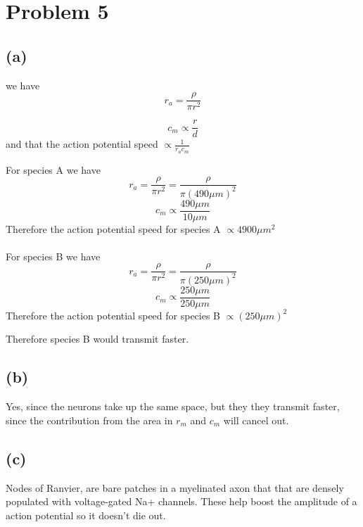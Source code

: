 \documentclass[12pt]{article}
\begin{document}
\section*{Problem 5}
\subsection*{(a)}
we have
$$r_a=\frac{\rho}{\pi r^2}$$

$$c_m\propto\frac{r}{d}$$
and that the action potential speed $\propto\frac{1}{r_ac_m}$


For species A we have
$$r_a=\frac{\rho}{\pi r^2}=\frac{\rho}{\pi (490\mu m)^2}$$
$$c_m\propto\frac{490\mu m}{10\mu m}$$Therefore the action potential speed for species A $\propto4900\mu m^2$\\\\
For species B we have
$$r_a=\frac{\rho}{\pi r^2}=\frac{\rho}{\pi (250\mu m)^2}$$
$$c_m\propto\frac{250\mu m}{250\mu m}$$
Therefore the action potential speed for species B $\propto (250 \mu m)^2$

Therefore species B would transmit faster.
\subsection*{(b)}
Yes, since the neurons take up the same space, but they they transmit faster, since the contribution from the area in $r_m$ and $c_m$ will cancel out.

\subsection*{(c)}
Nodes of Ranvier, are bare patches in a myelinated axon that that are densely populated with voltage-gated Na+ channels. These help boost the amplitude of a action potential so it doesn't die out.



 
\end{document}
